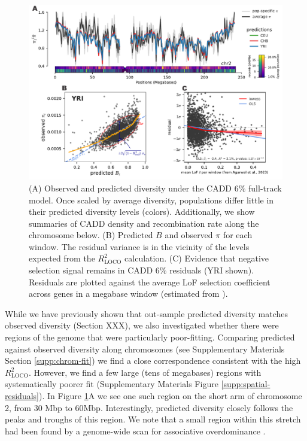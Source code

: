 \documentclass[11pt]{article}
\begin{document}
\begin{figure}[htbp] \centering
    \includegraphics[width=\textwidth]{figures/figure_6.pdf} 

    \caption{(A) Observed and predicted diversity under the CADD 6\% full-track
        model. Once scaled by average diversity, populations differ little in
        their predicted diversity levels (colors). Additionally, we show
        summaries of CADD density and recombination rate along the chromosome
        below. (B) Predicted $B$ and observed $\pi$ for each window. The
        residual variance is in the vicinity of the levels expected from the
        $R_\text{LOCO}^2$ calculation. (C) Evidence that negative selection
    signal remains in CADD 6\% residuals (YRI shown). Residuals are plotted
against the average LoF selection coefficient across genes in a megabase window
(estimated from \cite{Agarwal2023-un}).}

  \label{fig:figure-5}
\end{figure}

While we have previously shown that out-sample predicted diversity matches
observed diversity (Section XXX), we also investigated whether there were
regions of the genome that were particularly poor-fitting. Comparing predicted
against observed diversity along chromosomes (see Supplementary Materials
Section \ref{supp:chrom-fit}) we find a close correspondence consistent with
the high $R_\text{LOCO}^2$. However, we find a few large (tens of megabases)
regions with systematically poorer fit (Supplementary Materials Figure
\ref{supp:spatial-residuals}). In Figure \ref{fig:figure-5}A we see one such
region on the short arm of chromosome 2, from 30 Mbp to 60Mbp. Interestingly,
predicted diversity closely follows the peaks and troughs of this region. We
note that a small region within this stretch had been found by a genome-wide
scan for associative overdominance \parencite{Gilbert2020-aw}.  
\end{document}
